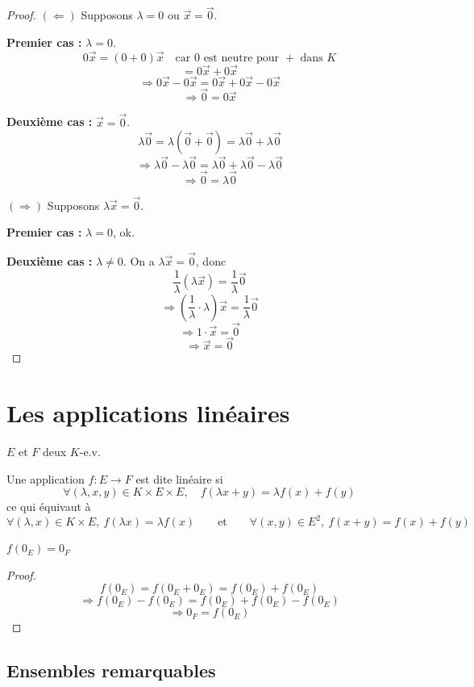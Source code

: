 \begin{proof}
$(\Leftarrow)$ Supposons $\lambda=0$ ou $\vec{x}=\vec{0}$.

\textbf{Premier cas :} $\lambda=0$.
\[0\vec{x} = (0+0)\vec{x} \quad \text{car } 0 \text{ est neutre pour } + \text{ dans } K\]
\[= 0\vec{x}+0\vec{x}\]
\[\Rightarrow 0\vec{x}-0\vec{x} = 0\vec{x}+0\vec{x}-0\vec{x}\]
\[\Rightarrow \vec{0} = 0\vec{x}\]

\textbf{Deuxième cas :} $\vec{x}=\vec{0}$.
\[\lambda\vec{0} = \lambda(\vec{0}+\vec{0}) = \lambda\vec{0}+\lambda\vec{0}\]
\[\Rightarrow \lambda\vec{0}-\lambda\vec{0} = \lambda\vec{0}+\lambda\vec{0}-\lambda\vec{0}\]
\[\Rightarrow \vec{0} = \lambda\vec{0}\]

$(\Rightarrow)$ Supposons $\lambda\vec{x}=\vec{0}$.

\textbf{Premier cas :} $\lambda=0$, ok.

\textbf{Deuxième cas :} $\lambda\neq 0$. On a $\lambda\vec{x}=\vec{0}$, donc
\[\frac{1}{\lambda}(\lambda\vec{x}) = \frac{1}{\lambda}\vec{0}\]
\[\Rightarrow \left(\frac{1}{\lambda}\cdot\lambda\right)\vec{x} = \frac{1}{\lambda}\vec{0}\]
\[\Rightarrow 1\cdot\vec{x} = \vec{0}\]
\[\Rightarrow \vec{x} = \vec{0}\]
\end{proof}

\section{Les applications linéaires}

$E$ et $F$ deux $K$-e.v.

\begin{defi}
Une application $f:E\to F$ est dite linéaire si
\[\forall (\lambda,x,y)\in K\times E\times E,\quad f(\lambda x+y) = \lambda f(x)+f(y)\]
ce qui équivaut à
\[\forall (\lambda,x)\in K\times E,\ f(\lambda x) = \lambda f(x) \qquad \text{et} \qquad \forall (x,y)\in E^2,\ f(x+y)=f(x)+f(y)\]
\end{defi}

\begin{prop}
$f(0_E) = 0_F$
\end{prop}

\begin{proof}
\[f(0_E) = f(0_E+0_E) = f(0_E)+f(0_E)\]
\[\Rightarrow f(0_E) - f(0_E) = f(0_E)+f(0_E)-f(0_E)\]
\[\Rightarrow 0_F = f(0_E)\]
\end{proof}

\subsection{Ensembles remarquables}

